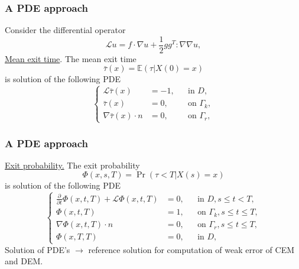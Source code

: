 \begin{frame}
\frametitle{A PDE approach}
Consider the differential operator
\begin{equation*}
		\mathcal Lu = f \cdot \nabla u + \frac{1}{2} gg^T : \nabla \nabla u,
\end{equation*}
\underline{Mean exit time}. The mean exit time 	$$\bar\tau(x) = \mathbb{E}(\tau | X(0) = x)$$ is solution of the following PDE
\begin{equation*}
\left \{
\begin{aligned}
	\mathcal L \bar \tau(x) &= -1, && \text{in } D, \\
	\bar\tau(x) &= 0, && \text{on } \Gamma_k, \\
	\nabla \bar\tau(x) \cdot n &= 0, && \text{on } \Gamma_r,
\end{aligned} \right .
\end{equation*}

\end{frame}

\begin{frame}
\frametitle{A PDE approach}
\underline{Exit probability.} The exit probability $$\Phi(x,s,T) = \Pr(\tau < T | X(s) = x)$$ is solution of the following PDE
\begin{equation*}
\left \{
\begin{aligned}
	\frac{\partial}{\partial t} \Phi(x,t,T) + \mathcal L \Phi(x,t,T) &= 0, && \text{in } D, s \leq t < T, \\
	\Phi(x,t,T) &= 1, && \text{on } \Gamma_k, s \leq t \leq T,\\
	\nabla \Phi(x,t,T) \cdot n &= 0, && \text{on } \Gamma_r, s \leq t \leq T, \\
	\Phi(x,T,T) &= 0, && \text{in } D,
\end{aligned} \right .
\end{equation*}
Solution of PDE's $\to$ reference solution for computation of weak error of CEM and DEM.
\end{frame}

